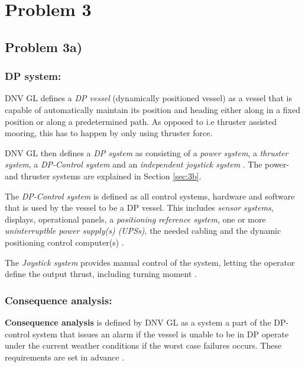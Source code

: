 \section{Problem 3}
\subsection{Problem 3a)}
\subsubsection{DP system:} \label{par:Def_DP_system}

DNV GL defines a \textit{DP vessel} (dynamically positioned vessel) as a vessel that is capable of automatically maintain its position and heading either along in a fixed position or along a predetermined path. As opposed to i.e thruster assisted mooring, this has to happen by only using thruster force\cite{RulesShipsDNVGLPart6Chap3}. 

DNV GL then defines a \textit{DP system} as consisting of a \textit{power system}, a \textit{thruster system}, a \textit{DP-Control system} and an \textit{independent joystick system} \cite{RulesShipsDNVGLPart6Chap3}. The power- and thruster systems are explained in Section \ref{sec:3b}. 

The \textit{DP-Control system} is defined as all control systems, hardware and software that is used by the vessel to be a DP vessel. This includes \textit{sensor systems}, displays, operational panels, a \textit{positioning reference system}, one or more \textit{uninterruptble power supply(s) (UPSs)}, the needed cabling and the dynamic positioning control computer(s) \cite{RulesShipsDNVGLPart6Chap3}.  

The \textit{Joystick system} provides manual control of the system, letting the operator define the output thrust, including turning moment \cite{RulesShipsDNVGLPart6Chap3}. %

\subsubsection{Consequence analysis:}
\textbf{Consequence analysis} is defined by DNV GL as a system a part of the DP-control system that issues an alarm if the vessel is unable to be in DP operate under the current weather conditions if the worst case failures occurs. These requirements are set in advance \cite{RulesShipsDNVGLPart6Chap3}. 



